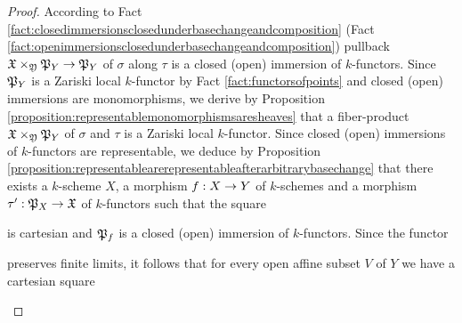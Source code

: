 \begin{proof}
According to Fact \ref{fact:closedimmersionsclosedunderbasechangeandcomposition} (Fact \ref{fact:openimmersionsclosedunderbasechangeandcomposition}) pullback $\fX\times_{\fY}\fP_Y\ra \fP_Y$ of $\sigma$ along $\tau$ is a closed (open) immersion of $k$-functors. Since $\fP_Y$ is a Zariski local $k$-functor by Fact \ref{fact:functorsofpoints} and closed (open) immersions are monomorphisms, we derive by Proposition \ref{proposition:representablemonomorphismsaresheaves} that a fiber-product $\fX\times_{\fY}\fP_Y$ of $\sigma$ and $\tau$ is a Zariski local $k$-functor. Since closed (open) immersions of $k$-functors are representable, we deduce by Proposition \ref{proposition:representablearerepresentableafterarbitrarybasechange} that there exists a $k$-scheme $X$, a morphism $f:X\ra Y$ of $k$-schemes and a morphism $\tau':\fP_X\ra \fX$ of $k$-functors such that the square
\begin{center}
\end{center}
is cartesian and $\fP_f$ is a closed (open) immersion of $k$-functors. Since the functor
\begin{center}
\end{center}
preserves finite limits, it follows that for every open affine subset $V$ of $Y$ we have a cartesian square
\begin{center}
\begin{tikzpicture}
[description/.style={fill=white,inner sep=2pt}]

\end{tikzpicture}
\end{center}
\end{proof}

